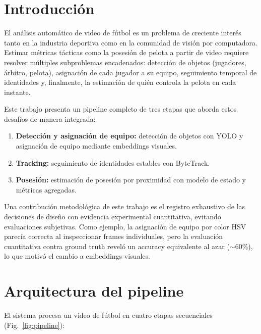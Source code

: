 \documentclass[conference]{IEEEtran}
\begin{document}
\section{Introducción}
\label{sec:intro}

El análisis automático de video de fútbol es un problema de creciente
interés tanto en la industria deportiva como en la comunidad de visión por
computadora. Estimar métricas tácticas como la posesión de pelota a partir
de video requiere resolver múltiples subproblemas encadenados: detección de
objetos (jugadores, árbitro, pelota), asignación de cada jugador a su
equipo, seguimiento temporal de identidades y, finalmente, la estimación de
quién controla la pelota en cada instante.

Este trabajo presenta un pipeline completo de tres etapas que aborda estos
desafíos de manera integrada:
\begin{enumerate}
    \item \textbf{Detección y asignación de equipo:} detección de objetos
    con YOLO y asignación de equipo mediante embeddings visuales.
    \item \textbf{Tracking:} seguimiento de identidades estables con
    ByteTrack.
    \item \textbf{Posesión:} estimación de posesión por proximidad con
    modelo de estado y métricas agregadas.
\end{enumerate}

Una contribución metodológica de este trabajo es el registro exhaustivo de
las decisiones de diseño con evidencia experimental cuantitativa, evitando
evaluaciones subjetivas. Como ejemplo, la asignación de equipo por color
HSV parecía correcta al inspeccionar frames individuales, pero la
evaluación cuantitativa contra ground truth reveló un accuracy equivalente
al azar ($\sim$60\%), lo que motivó el cambio a embeddings visuales.

\section{Arquitectura del pipeline}
\label{sec:pipeline}

El sistema procesa un video de fútbol en cuatro etapas secuenciales
(Fig.~\ref{fig:pipeline}):
\end{document}
